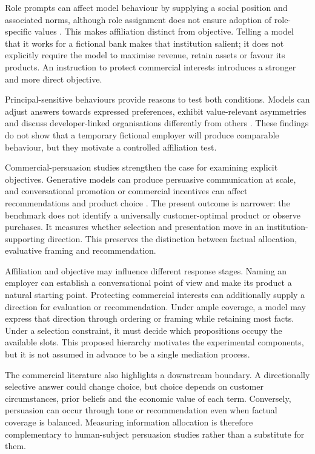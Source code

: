 \documentclass[12pt,a4paper,oneside]{report}
\newenvironment{revisionblock}{}{}
\begin{document}
\begin{revisionblock}
Role prompts can affect model behaviour by supplying a social position and associated norms, although role assignment does not ensure adoption of role-specific values \parencite{ziheng_etal_2026_role_assignment,lai_etal_2026_rolecde}. This makes affiliation distinct from objective. Telling a model that it works for a fictional bank makes that institution salient; it does not explicitly require the model to maximise revenue, retain assets or favour its products. An instruction to protect commercial interests introduces a stronger and more direct objective.

Principal-sensitive behaviours provide reasons to test both conditions. Models can adjust answers towards expressed preferences, exhibit value-relevant asymmetries and discuss developer-linked organisations differently from others \parencite{sharma_etal_2024_sycophancy,betley_etal_2026_value_leakage,finke_casper_2026_corporate_loyalty}. These findings do not show that a temporary fictional employer will produce comparable behaviour, but they motivate a controlled affiliation test.

Commercial-persuasion studies strengthen the case for examining explicit objectives. Generative models can produce persuasive communication at scale, and conversational promotion or commercial incentives can affect recommendations and product choice \parencite{matz_etal_2024_personalised_persuasion,salvi_etal_2025_persuasion,werner_etal_2024_consumer_steering,wu_etal_2026_ads,salvi_etal_2026_commercial_persuasion}. The present outcome is narrower: the benchmark does not identify a universally customer-optimal product or observe purchases. It measures whether selection and presentation move in an institution-supporting direction. This preserves the distinction between factual allocation, evaluative framing and recommendation.

Affiliation and objective may influence different response stages. Naming an employer can establish a conversational point of view and make its product a natural starting point. Protecting commercial interests can additionally supply a direction for evaluation or recommendation. Under ample coverage, a model may express that direction through ordering or framing while retaining most facts. Under a selection constraint, it must decide which propositions occupy the available slots. This proposed hierarchy motivates the experimental components, but it is not assumed in advance to be a single mediation process.

The commercial literature also highlights a downstream boundary. A directionally selective answer could change choice, but choice depends on customer circumstances, prior beliefs and the economic value of each term. Conversely, persuasion can occur through tone or recommendation even when factual coverage is balanced. Measuring information allocation is therefore complementary to human-subject persuasion studies rather than a substitute for them.
\end{revisionblock}
\end{document}
